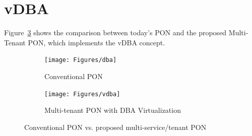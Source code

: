 







\section{\acf{vDBA} }

Figure~\ref{DBAvsVDBA} shows the comparison between today's \ac{PON} and the proposed Multi-Tenant \ac{PON}, which implements the \ac{vDBA} concept.

\begin{figure}[h]
\centering
\begin{subfigure}{0.41\columnwidth}
 \texttt{[image: Figures/dba]}
\caption{Conventional \ac{PON}}%
\label{dba}
\end{subfigure}\hfill%
\begin{subfigure}{0.59\columnwidth}
 \texttt{[image: Figures/vdba]}
\caption{Multi-tenant \ac{PON} with \ac{DBA} Virtualization}%
\label{vdba}
\end{subfigure}\hfill%
\caption{Conventional \ac{PON} vs. proposed multi-service/tenant \ac{PON}}
\label{DBAvsVDBA}%
\end{figure}


